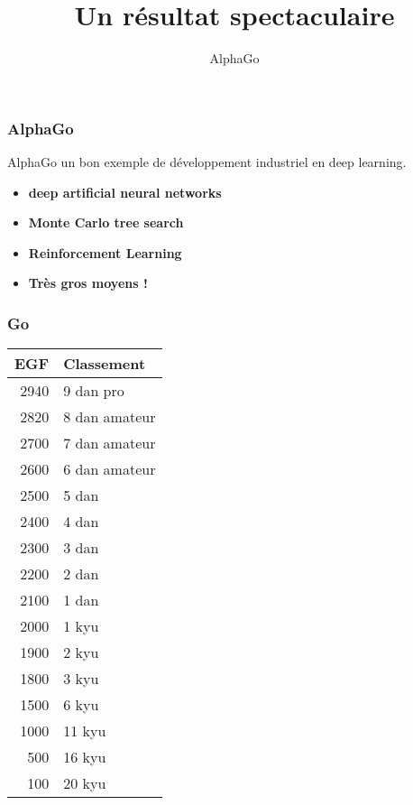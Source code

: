 \documentclass{formation}
\title{Un résultat spectaculaire}
\subtitle{AlphaGo}
\begin{document}
\maketitle

\begin{frame}
  \frametitle{AlphaGo}
  AlphaGo un bon exemple de développement industriel en deep learning.
  \begin{itemize}
  \item \textbf{deep artificial neural networks}
  \item \textbf{Monte Carlo tree search}
  \item \textbf{Reinforcement Learning}
  \item \textbf{Très gros moyens !}    
  \end{itemize}
\end{frame}

\begin{frame}
  \frametitle{Go}
  \begin{minipage}[c]{0.7\linewidth}
  \end{minipage}\hfill
  \begin{minipage}[c]{0.26\linewidth}
    \begin{adjustbox}{scale=0.8}
      \begin{tabular}{| r | l |}
        \hline
        EGF & Classement \\ \hline
        2940 & 9 dan pro \\ \hline
        2820 & 8 dan amateur \\ \hline
        2700 & 7 dan amateur \\ \hline
        2600 & 6 dan amateur \\ \hline
        2500 & 5 dan \\ \hline
        2400 & 4 dan \\ \hline
        2300 & 3 dan \\ \hline
        2200 & 2 dan \\ \hline
        2100 & 1 dan \\ \hline
        2000 & 1 kyu \\ \hline
        1900 & 2 kyu \\ \hline
        1800 & 3 kyu \\ \hline
        1500 & 6 kyu \\ \hline
        1000 & 11 kyu \\ \hline
        500 & 16 kyu \\ \hline
        100 & 20 kyu \\ \hline
      \end{tabular}
    \end{adjustbox}
  \end{minipage}\hfill
\end{frame}
\end{document}
